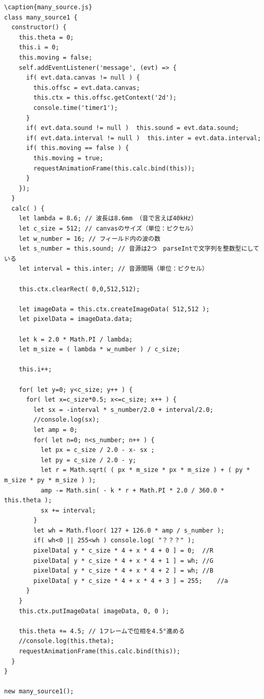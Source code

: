 \documentclass[a4j,12pt]{jsarticle}
\begin{document}
\begin{lstlisting}
\caption{many_source.js}
class many_source1 {
  constructor() {
    this.theta = 0;
    this.i = 0;
    this.moving = false;
    self.addEventListener('message', (evt) => {
      if( evt.data.canvas != null ) {
        this.offsc = evt.data.canvas;
        this.ctx = this.offsc.getContext('2d');
        console.time('timer1');
      }
      if( evt.data.sound != null )  this.sound = evt.data.sound;
      if( evt.data.interval != null )  this.inter = evt.data.interval;
      if( this.moving == false ) {
        this.moving = true;
        requestAnimationFrame(this.calc.bind(this));
      }
    });
  }
  calc( ) {
    let lambda = 8.6; // 波長は8.6mm （音で言えば40kHz）
    let c_size = 512; // canvasのサイズ（単位：ピクセル）
    let w_number = 16; // フィールド内の波の数
    let s_number = this.sound; // 音源は2つ　parseIntで文字列を整数型にしている
    let interval = this.inter; // 音源間隔（単位：ピクセル）

    this.ctx.clearRect( 0,0,512,512);

    let imageData = this.ctx.createImageData( 512,512 );
    let pixelData = imageData.data;

    let k = 2.0 * Math.PI / lambda;
    let m_size = ( lambda * w_number ) / c_size;

    this.i++;

    for( let y=0; y<c_size; y++ ) {
      for( let x=c_size*0.5; x<=c_size; x++ ) {
        let sx = -interval * s_number/2.0 + interval/2.0;
        //console.log(sx);
        let amp = 0;
        for( let n=0; n<s_number; n++ ) {
          let px = c_size / 2.0 - x- sx ;
          let py = c_size / 2.0 - y;
          let r = Math.sqrt( ( px * m_size * px * m_size ) + ( py * m_size * py * m_size ) );
          amp -= Math.sin( - k * r + Math.PI * 2.0 / 360.0 * this.theta );
          sx += interval;
        }
        let wh = Math.floor( 127 + 126.0 * amp / s_number );
        if( wh<0 || 255<wh ) console.log( "？？？" );
        pixelData[ y * c_size * 4 + x * 4 + 0 ] = 0;  //R
        pixelData[ y * c_size * 4 + x * 4 + 1 ] = wh; //G
        pixelData[ y * c_size * 4 + x * 4 + 2 ] = wh; //B
        pixelData[ y * c_size * 4 + x * 4 + 3 ] = 255;    //a
      }
    }
    this.ctx.putImageData( imageData, 0, 0 );

    this.theta += 4.5; // 1フレームで位相を4.5°進める
    //console.log(this.theta);
    requestAnimationFrame(this.calc.bind(this));
  }
}

new many_source1();

\end{lstlisting}
\newpage
\end{document}
